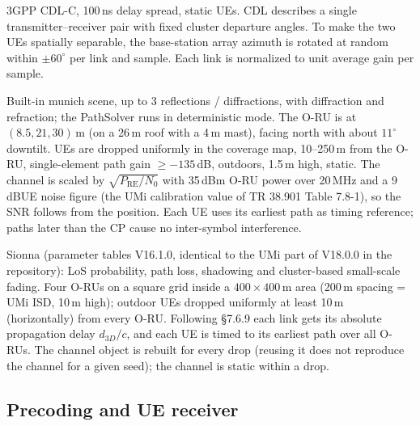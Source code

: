 \documentclass[11pt,a4paper]{article}
\DeclareRobustCommand{\code}[1]{\codeurl{#1}}  %
\newcommand{\dB}{\,dB}
\begin{document}
\begin{description}[leftmargin=1.2em, style=nextline]
  \item[CDL-C (E1, open loop)] 3GPP CDL-C, 100\,ns delay spread, static UEs. CDL describes a single transmitter--receiver pair
        with fixed cluster departure angles. To make the two UEs spatially separable, the base-station array azimuth is rotated
        at random within $\pm 60^\circ$ per link and sample. Each link is normalized to unit average gain per sample.
  \item[Sionna RT ray tracing (E2, E3, closed loop)] Built-in munich scene, up to 3 reflections / diffractions, with diffraction
        and refraction; the PathSolver runs in deterministic mode. The O-RU is at $(8.5, 21, 30)$\,m (on a 26\,m roof with a
        4\,m mast), facing north with about $11^\circ$ downtilt. UEs are dropped uniformly in the coverage map, 10--250\,m from
        the O-RU, single-element path gain $\ge -135$\dB, outdoors, 1.5\,m high, static. The channel is scaled by
        $\sqrt{P_{\mathrm{RE}}/N_0}$ with 35\,dBm O-RU power over 20\,MHz and a 9\dB UE noise figure (the UMi calibration value
        of TR 38.901 Table 7.8-1), so the SNR follows from the position. Each UE uses its earliest path as timing reference;
        paths later than the CP cause no inter-symbol interference.
  \item[TR 38.901 UMi-Street Canyon (F1, cell-free)] Sionna \code{tr38901.UMi} (parameter tables V16.1.0, identical to the UMi
        part of V18.0.0 in the repository): LoS probability, path loss, shadowing and cluster-based small-scale fading. Four
        O-RUs on a square grid inside a $400 \times 400$\,m area (200\,m spacing = UMi ISD, 10\,m high); outdoor UEs dropped
        uniformly at least 10\,m (horizontally) from every O-RU. Following \S 7.6.9 each link gets its absolute propagation delay
        $d_{3D}/c$, and each UE is timed to its earliest path over all O-RUs. The channel object is rebuilt for every drop
        (reusing it does not reproduce the channel for a given seed); the channel is static within a drop.
\end{description}

\subsection{Precoding and UE receiver}
\end{document}
